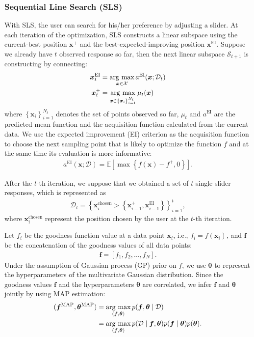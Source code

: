 \subsubsection{Sequential Line Search (SLS)}
\label{sec:sls}
With SLS, the user can search for his/her preference by adjusting a slider.
At each iteration of the optimization, SLS constructs a linear subspace using the current-best position $\bm{x}^{+}$ and the best-expected-improving position $\bm{x}^{\text{EI}}$.
Suppose we already have $t$ observed response so far, then the next linear subspace $\mathcal{S}_{t+1}$ is constructing by connecting:
\begin{align}
    \bm{x}^\text{EI}_t &= \mathop{\rm arg~max}\limits_{\bm{x}\in{\mathcal{X}}}a^\text{EI}(\bm{x};\mathcal{D}_t) \label{eq:build_subspace} \\ \nonumber
    \bm{x}^+_t &= \mathop{\rm arg~max}\limits_{\bm{x}\in{\left\{\bm{x}_i\right\}_{i=1}^{N_t}}}\mu_t(\bm{x})
\end{align}
where $\left\{\bm{x}_i\right\}_{i=1}^{N_t}$ denotes the set of points observed so far, $\mu_t$ and $a^\text{EI}$ are the predicted mean function and the acquisition function calculated from the current data.
We use the expected improvement (EI) criterion as the acquisition function to choose the next sampling point that is likely to optimize the function $f$ and at the same time its evaluation is more informative:
\begin{align} \label{equation:acquisition}
    a^{\text{EI}}(\bm{x} ; \mathcal{D})=\mathbb{E}\left[\max \left\{f(\bm{x})-f^{+}, 0\right\}\right].
\end{align}

After the $t$-th iteration, we suppose that we obtained a set of $t$ single slider responses, which is represented as
\begin{align}
    \mathcal{D}_t=\left\{\bm{x}_i^\text{chosen}>\left\{\bm{x}_{i-1}^{+}, \bm{x}_{i-1}^{\text{EI}}\right\}\right\}_{i=1}^t,
\label{eq:response_data}
\end{align}
where $\bm{x}_i^{\text{chosen}}$ represent the position chosen by the user at the $t$-th iteration.

Let $f_i$ be the goodness function value at a data point $\bm{x}_i$, i.e., $f_i = f(\bm{x}_i)$, and $\bm{f}$ be the concatenation of the goodness values of all data points:
\begin{align}
\bm{f} = [f_1, f_2, \ldots, f_N].
\end{align}
Under the assumption of Gaussian process (GP) prior on $f$, we use $\bm{\theta}$ to represent the hyperparameters of the multivariate Gaussian distribution.
Since the goodness values $\bm{f}$ and the hyperparameters $\bm{\theta}$ are correlated, we infer $\bm{f}$ and $\bm{\theta}$ jointly by using MAP estimation:
\begin{align}
(\bm{f}^{\text{MAP}}, \bm{\theta}^{\text{MAP}})&=\mathop{\rm arg~max}\limits_{(\bm{f},\bm{\theta})}p(\bm{f}, \bm{\theta} \mid \mathcal{D}) \nonumber \\
&= \mathop{\rm arg~max}\limits_{(\bm{f},\bm{\theta})}p(\mathcal{D} \mid \bm{f}, \bm{\theta}) p(\bm{f}\mid \bm{\theta}) p(\bm{\theta}).
\label{eq:map}
\end{align}

